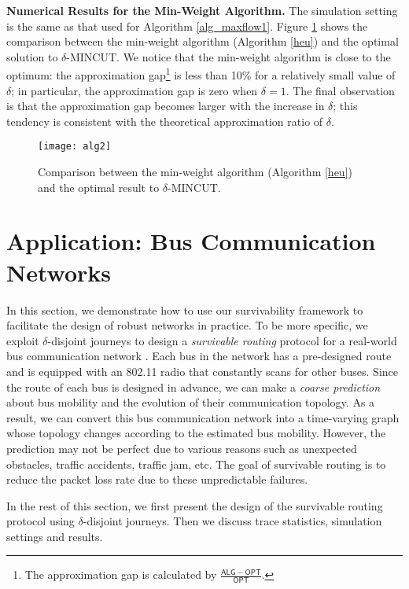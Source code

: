 \documentclass[10pt, conference, letterpaper]{IEEEtran}
\begin{document}
\noindent \textbf{Numerical Results for the Min-Weight Algorithm.} The simulation setting is the same as that used for Algorithm \ref{alg_maxflow1}. Figure \ref{gap_mincut} shows the comparison between the min-weight algorithm (Algorithm \ref{heu}) and the optimal solution to $\delta$-MINCUT.
We notice that the min-weight algorithm is close to the optimum: the approximation gap\footnote{The approximation gap is calculated by $\frac{\mathsf{ALG}-\mathsf{OPT}}{\mathsf{OPT}}$.} is less than 10\% for a relatively small value of $\delta$; in particular, the approximation gap is zero when $\delta=1$. The final observation is that the approximation gap becomes larger with the increase in $\delta$; this tendency is consistent with the theoretical approximation ratio of $\delta$.

\begin{figure}[ht]
\begin{center}
\texttt{[image: alg2]}
\caption{Comparison between the min-weight algorithm (Algorithm \ref{heu}) and the optimal result to $\delta$-MINCUT.}
\label{gap_mincut}\vspace{-3mm}
\end{center}
\end{figure}


\section{Application: Bus Communication Networks}\label{app1}
In this section, we demonstrate how to use our survivability framework to facilitate the design of robust networks in practice. To be more specific, we exploit  $\delta$-disjoint journeys to design a \emph{survivable routing} protocol for a real-world bus communication network \cite{trace}. Each bus in the network has a pre-designed route and is equipped with an 802.11 radio that constantly scans for other buses. Since the route of each bus is designed in advance, we can make a \emph{coarse prediction} about bus mobility and the evolution of their communication topology. As a result, we can convert this bus communication network into a time-varying graph whose topology changes according to the estimated bus mobility. However, the prediction may not be perfect due to various reasons such as unexpected obstacles, traffic accidents, traffic jam, etc.  The goal of survivable routing is to reduce the packet loss rate due to these unpredictable failures.

In the rest of this section, we first present the design of the survivable routing protocol using $\delta$-disjoint journeys. Then we discuss trace statistics, simulation settings and results.
\end{document}

